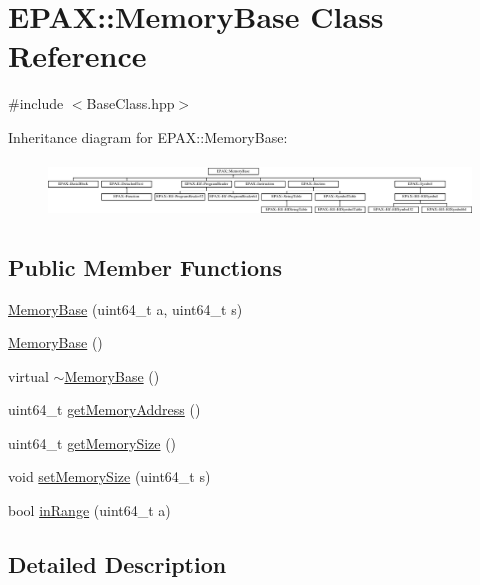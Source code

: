 \hypertarget{class_e_p_a_x_1_1_memory_base}{\section{\-E\-P\-A\-X\-:\-:\-Memory\-Base \-Class \-Reference}
\label{class_e_p_a_x_1_1_memory_base}
}


{\ttfamily \#include $<$\-Base\-Class.\-hpp$>$}

\-Inheritance diagram for \-E\-P\-A\-X\-:\-:\-Memory\-Base\-:\begin{figure}[H]
\begin{center}
\leavevmode
\includegraphics[height=1.513514cm]{class_e_p_a_x_1_1_memory_base}
\end{center}
\end{figure}
\subsection*{\-Public \-Member \-Functions}
\begin{DoxyCompactItemize}
\item 
\hyperlink{class_e_p_a_x_1_1_memory_base_aab70a4cec3d7a6386cc02f3ea7475335}{\-Memory\-Base} (uint64\-\_\-t a, uint64\-\_\-t s)
\item 
\hyperlink{class_e_p_a_x_1_1_memory_base_a8a9e77bc67627ef0c1655b7aa9510e95}{\-Memory\-Base} ()
\item 
virtual \hyperlink{class_e_p_a_x_1_1_memory_base_a1b771e1cdf376ee2960bf7a6947fe110}{$\sim$\-Memory\-Base} ()
\item 
uint64\-\_\-t \hyperlink{class_e_p_a_x_1_1_memory_base_afecca3bccbbf4d19d16bc2490ad086ca}{get\-Memory\-Address} ()
\item 
uint64\-\_\-t \hyperlink{class_e_p_a_x_1_1_memory_base_aac80cc9059e3f458027a22eb5ea59e01}{get\-Memory\-Size} ()
\item 
void \hyperlink{class_e_p_a_x_1_1_memory_base_ae39b6d63f7791f5192c9cb9a28b4a218}{set\-Memory\-Size} (uint64\-\_\-t s)
\item 
bool \hyperlink{class_e_p_a_x_1_1_memory_base_a2491f4748c4c0aa3311e586919730e3e}{in\-Range} (uint64\-\_\-t a)
\end{DoxyCompactItemize}


\subsection{\-Detailed \-Description}



